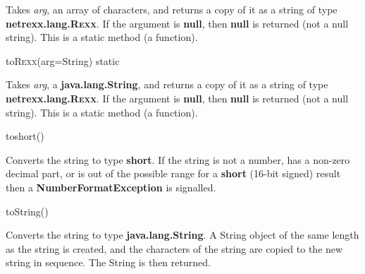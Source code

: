 \begin{description}
Takes \emph{arg}, an array of characters, and returns a copy
of it as a string of type \textbf{netrexx.lang.R\textsc{exx}}.
If the argument is \textbf{null}, then \textbf{null} is returned
(not a null string).
This is a static method (a function).
\item{toR\textsc{exx}(arg=String) static}

 
Takes \emph{arg}, a \textbf{java.lang.String}, and returns a copy
of it as a string of type \textbf{netrexx.lang.R\textsc{exx}}.
If the argument is \textbf{null}, then \textbf{null} is returned
(not a null string).
This is a static method (a function).
\item{toshort()}

Converts the string to type \textbf{short}.  If the string is
not a number, has a non-zero decimal part, or is out of the possible
range for a \textbf{short} (16-bit signed) result then
a \textbf{NumberFormatException} is signalled.
\item{toString()}

Converts the string to type \textbf{java.lang.String}.  A String
object of the same length as the string is created, and the characters
of the string are copied to the new string in sequence.  The String is
then returned.
\end{description}
